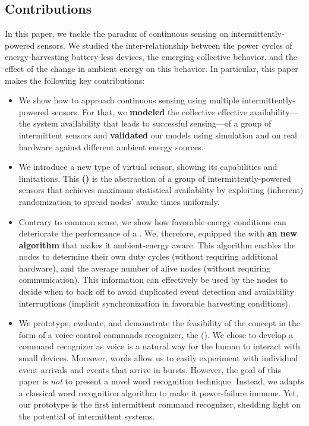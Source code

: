 \subsection{Contributions}
In this paper, we tackle the paradox of continuous sensing on intermittently-powered sensors. 
We studied the inter-relationship between the power cycles of energy-harvesting battery-less devices, the emerging collective behavior, and the effect of the change in ambient energy on this behavior. In particular, this paper makes the following key contributions:
\begin{itemize}[leftmargin=*]
%
\item We show how to approach continuous sensing using multiple intermittently-powered sensors. 
For that, we \textbf{modeled} the collective effective availability---the system availability that leads to successful sensing---of a group of intermittent sensors and \textbf{validated} our models using simulation and on real hardware against different ambient energy sources. 
%
\item We introduce a new type of virtual sensor, showing its capabilities and limitations. This \textbf{\fullcis (\cis)} is the abstraction of a group of intermittently-powered sensors that achieves maximum statistical availability by exploiting (inherent) randomization to spread nodes' awake times uniformly.
% 
\item Contrary to common sense, we show how favorable energy conditions can deteriorate the performance of a \cis. We, therefore, equipped the \cis with \textbf{an new algorithm} that makes it ambient-energy aware. This algorithm enables the nodes to determine their own duty cycles (without requiring additional hardware), and the average number of alive nodes (without requiring communication). This information can effectively be used by the nodes to decide when to back off to avoid duplicated event detection and availability interruptions (implicit synchronization in favorable harvesting conditions).
%
\item We prototype, evaluate, and demonstrate the feasibility of the \fullcis concept in the form of a voice-control commands recognizer, the \textbf{\fullCIM} (\textbf{\cim}). 
We chose to develop a command recognizer as 
voice is a natural way for the human to interact with small devices. Moreover, words allow us to easily experiment with individual event arrivals and events that arrive in bursts. 
However, the goal of this paper is \emph{not} to present a novel word recognition technique. 
Instead, we adapts a classical word recognition algorithm to make it power-failure immune. Yet, our \cim prototype is the first intermittent command recognizer, shedding light on the potential of intermittent systems. 

\end{itemize}





















